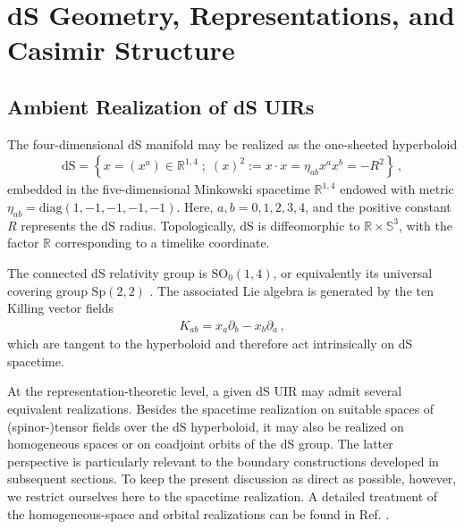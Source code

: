 \documentclass[aps,twocolumn,nofootinbib]{revtex4}
\begin{document}
\section{dS Geometry, Representations, and Casimir Structure}\label{Sec. Machinery}


\subsection{Ambient Realization of dS UIRs}

The four-dimensional dS manifold may be realized as the one-sheeted hyperboloid
\begin{align}
    \mathrm{dS} = \left\{ x = (x^a) \in {\mathbb{R}}^{1,4} \;;\; (x)^2 := x\cdot x = \eta_{ab}x^a x^b = -R^2 \right\} \,,
\end{align}
embedded in the five-dimensional Minkowski spacetime $\mathbb{R}^{1,4}$ endowed with metric $\eta_{ab}=\mathrm{diag}(1,-1,-1,-1,-1)$. Here,  $a,b=0,1,2,3,4$, and the positive constant $R$ represents the dS radius. Topologically, dS is diffeomorphic to $\mathbb{R}\times\mathbb{S}^3$, with the factor $\mathbb{R}$ corresponding to a timelike coordinate.

The connected dS relativity group is $\mathrm{SO}_0(1,4)$, or equivalently its universal covering group $\mathrm{Sp}(2,2)$ \cite{Gazeau2022, GazPejTod2026}. The associated Lie algebra is generated by the ten Killing vector fields
\begin{align}
    K_{ab} = x_a\partial_b - x_b\partial_a \,,
\end{align}
which are tangent to the hyperboloid and therefore act intrinsically on dS spacetime.

At the representation-theoretic level, a given dS UIR may admit several equivalent realizations. Besides the spacetime realization on suitable spaces of (spinor-)tensor fields over the dS hyperboloid, it may also be realized on homogeneous spaces or on coadjoint orbits of the dS group. The latter perspective is particularly relevant to the boundary constructions developed in subsequent sections. To keep the present discussion as direct as possible, however, we restrict ourselves here to the spacetime realization. A detailed treatment of the homogeneous-space and orbital realizations can be found in Ref. \cite{Gazeau2022}.
\end{document}
